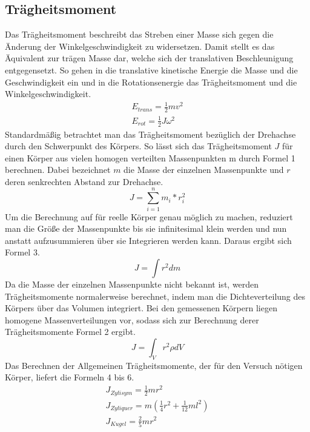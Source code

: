 \documentclass[titlepage = firstcover]{scrartcl}
\begin{document}
      \subsection{Trägheitsmoment}
      Das Trägheitsmoment beschreibt das Streben einer Masse sich gegen die Änderung der Winkelgeschwindigkeit zu widersetzen. Damit stellt es 
      das Äquivalent zur trägen Masse dar, welche sich der translativen Beschleunigung entgegensetzt. So gehen in die translative kinetische Energie
      die Masse und die Geschwindigkeit ein und in die Rotationsenergie das Trägheitsmoment und die Winkelgeschwindigkeit.
      \begin{align*}
        E_{trans} = \frac{1}{2} mv^2 \\
        E_{rot} = \frac{1}{2}J \omega^2
      \end{align*}
      Standardmäßig betrachtet man das Trägheitsmoment bezüglich der Drehachse durch den Schwerpunkt des Körpers. So lässt sich das Trägheitsmoment 
      $J$ für einen Körper aus vielen homogen verteilten Massenpunkten m durch Formel 1 berechnen. Dabei bezeichnet $m$ die Masse der einzelnen 
      Massenpunkte und $r$ deren senkrechten Abstand zur Drehachse.
      \begin{equation}
        J = \sum_{i=1}^n m_i * r_i^2
      \end{equation}
      Um die Berechnung auf für reelle Körper genau möglich zu machen, reduziert man die Größe der Massenpunkte bis sie infinitesimal klein werden und  
      nun anstatt aufzusummieren über sie Integrieren werden kann. Daraus ergibt sich Formel 3.
      \begin{equation}
        J = \int r^2 dm
      \end{equation}
      Da die Masse der einzelnen Massenpunkte nicht bekannt ist, werden Trägheitsmomente normalerweise berechnet, indem man die Dichteverteilung des Körpers 
      über das Volumen integriert. Bei den gemessenen Körpern liegen homogene Massenverteilungen vor, sodass sich zur Berechnung derer Trägheitsmomente 
      Formel 2 ergibt.  
      \begin{equation}
        J = \int_V r^2 \rho dV
      \end{equation}
      Das Berechnen der Allgemeinen Trägheitsmomente, der für den Versuch nötigen Körper, liefert die Formeln 4 bis 6.
      \begin{align}
        J_{Zylisym} = \frac{1}{2}mr^2 \\
        J_{Zyliquer} = m(\frac{1}{4}r^2 + \frac{1}{12}ml^2) \\
        J_{Kugel} = \frac{2}{5}mr^2
      \end{align}
\end{document}
